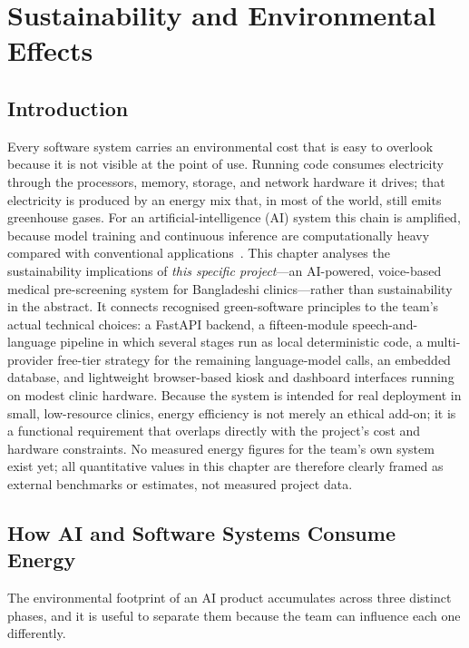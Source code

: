 \documentclass[11pt,a4paper]{article}
\begin{document}
\section{Sustainability and Environmental Effects}

\subsection{Introduction}
Every software system carries an environmental cost that is easy to overlook because
it is not visible at the point of use. Running code consumes electricity through the
processors, memory, storage, and network hardware it drives; that electricity is
produced by an energy mix that, in most of the world, still emits greenhouse gases.
For an artificial-intelligence (AI) system this chain is amplified, because model
training and continuous inference are computationally heavy compared with conventional
applications~\cite{schwartz2020,strubell2019}. This chapter analyses the sustainability
implications of \emph{this specific project}---an AI-powered, voice-based medical
pre-screening system for Bangladeshi clinics---rather than sustainability in the
abstract. It connects recognised green-software principles to the team's actual
technical choices: a FastAPI backend, a fifteen-module speech-and-language pipeline in
which several stages run as local deterministic code, a multi-provider free-tier
strategy for the remaining language-model calls, an embedded database, and lightweight
browser-based kiosk and dashboard interfaces running on modest clinic hardware. Because
the system is intended for real deployment in small, low-resource clinics, energy
efficiency is not merely an ethical add-on; it is a functional requirement that overlaps
directly with the project's cost and hardware constraints. No measured energy figures for
the team's own system exist yet; all quantitative values in this chapter are therefore
clearly framed as external benchmarks or estimates, not measured project data.

\subsection{How AI and Software Systems Consume Energy}
The environmental footprint of an AI product accumulates across three distinct phases,
and it is useful to separate them because the team can influence each one differently.
\end{document}
